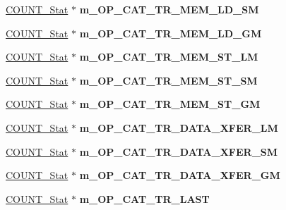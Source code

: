\begin{DoxyCompactItemize}
\item 
\hypertarget{classall__stats__c_a465f20004496873e34dac174bdfc21c3}{
\hyperlink{classCOUNT__Stat}{COUNT\_\-Stat} $\ast$ {\bfseries m\_\-OP\_\-CAT\_\-TR\_\-MEM\_\-LD\_\-SM}}
\label{classall__stats__c_a465f20004496873e34dac174bdfc21c3}

\item 
\hypertarget{classall__stats__c_aa2609eeb12c9382ab183d3668956220b}{
\hyperlink{classCOUNT__Stat}{COUNT\_\-Stat} $\ast$ {\bfseries m\_\-OP\_\-CAT\_\-TR\_\-MEM\_\-LD\_\-GM}}
\label{classall__stats__c_aa2609eeb12c9382ab183d3668956220b}

\item 
\hypertarget{classall__stats__c_aaae1e1408105aa44801660d2b8deb419}{
\hyperlink{classCOUNT__Stat}{COUNT\_\-Stat} $\ast$ {\bfseries m\_\-OP\_\-CAT\_\-TR\_\-MEM\_\-ST\_\-LM}}
\label{classall__stats__c_aaae1e1408105aa44801660d2b8deb419}

\item 
\hypertarget{classall__stats__c_a0b6d49069fddfac5a4313ffd0c76a737}{
\hyperlink{classCOUNT__Stat}{COUNT\_\-Stat} $\ast$ {\bfseries m\_\-OP\_\-CAT\_\-TR\_\-MEM\_\-ST\_\-SM}}
\label{classall__stats__c_a0b6d49069fddfac5a4313ffd0c76a737}

\item 
\hypertarget{classall__stats__c_a98844f268a11b26d4293f24978086975}{
\hyperlink{classCOUNT__Stat}{COUNT\_\-Stat} $\ast$ {\bfseries m\_\-OP\_\-CAT\_\-TR\_\-MEM\_\-ST\_\-GM}}
\label{classall__stats__c_a98844f268a11b26d4293f24978086975}

\item 
\hypertarget{classall__stats__c_a58e5b207757b929892d079d5b7f36946}{
\hyperlink{classCOUNT__Stat}{COUNT\_\-Stat} $\ast$ {\bfseries m\_\-OP\_\-CAT\_\-TR\_\-DATA\_\-XFER\_\-LM}}
\label{classall__stats__c_a58e5b207757b929892d079d5b7f36946}

\item 
\hypertarget{classall__stats__c_a4a495f7c0a128aaa255501c3e0928922}{
\hyperlink{classCOUNT__Stat}{COUNT\_\-Stat} $\ast$ {\bfseries m\_\-OP\_\-CAT\_\-TR\_\-DATA\_\-XFER\_\-SM}}
\label{classall__stats__c_a4a495f7c0a128aaa255501c3e0928922}

\item 
\hypertarget{classall__stats__c_adb9d297c8d346a00a01b089d3c6def2d}{
\hyperlink{classCOUNT__Stat}{COUNT\_\-Stat} $\ast$ {\bfseries m\_\-OP\_\-CAT\_\-TR\_\-DATA\_\-XFER\_\-GM}}
\label{classall__stats__c_adb9d297c8d346a00a01b089d3c6def2d}

\item 
\hypertarget{classall__stats__c_aa67f8a34dcebc51df9bd7d2b65b6fc09}{
\hyperlink{classCOUNT__Stat}{COUNT\_\-Stat} $\ast$ {\bfseries m\_\-OP\_\-CAT\_\-TR\_\-LAST}}
\label{classall__stats__c_aa67f8a34dcebc51df9bd7d2b65b6fc09}


\end{DoxyCompactItemize}
